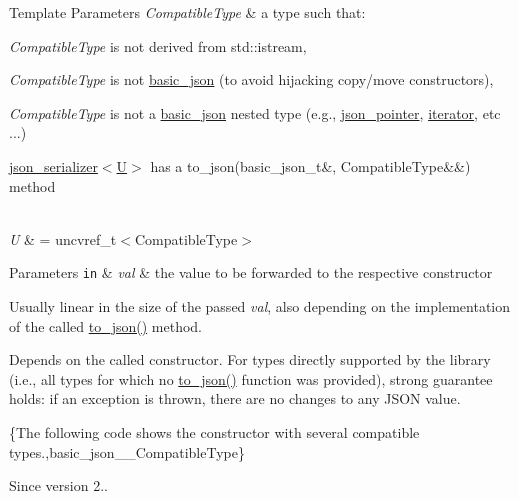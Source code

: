 \begin{DoxyTemplParams}{Template Parameters}
{\em Compatible\+Type} & a type such that\+:
\begin{DoxyItemize}
\item {\itshape Compatible\+Type} is not derived from {\ttfamily std\+::istream},
\item {\itshape Compatible\+Type} is not \hyperlink{classnlohmann_1_1basic__json}{basic\+\_\+json} (to avoid hijacking copy/move constructors),
\item {\itshape Compatible\+Type} is not a \hyperlink{classnlohmann_1_1basic__json}{basic\+\_\+json} nested type (e.\+g., \hyperlink{classnlohmann_1_1json__pointer}{json\+\_\+pointer}, \hyperlink{classnlohmann_1_1basic__json_a099316232c76c034030a38faa6e34dca}{iterator}, etc ...)
\item \hyperlink{classnlohmann_1_1basic__json_a7768841baaaa7a21098a401c932efaff}{json\+\_\+serializer$<$\+U$>$} has a {\ttfamily to\+\_\+json(basic\+\_\+json\+\_\+t\&, Compatible\+Type\&\&)} method
\end{DoxyItemize}\\
\hline
{\em U} & = {\ttfamily uncvref\+\_\+t$<$Compatible\+Type$>$}\\
\hline
\end{DoxyTemplParams}

\begin{DoxyParams}[1]{Parameters}
\mbox{\tt in}  & {\em val} & the value to be forwarded to the respective constructor\\
\hline
\end{DoxyParams}
Usually linear in the size of the passed {\itshape val}, also depending on the implementation of the called {\ttfamily \hyperlink{namespacenlohmann_1_1detail_aa7a47b08eee864c2c108c04954919648}{to\+\_\+json()}} method.

Depends on the called constructor. For types directly supported by the library (i.\+e., all types for which no {\ttfamily \hyperlink{namespacenlohmann_1_1detail_aa7a47b08eee864c2c108c04954919648}{to\+\_\+json()}} function was provided), strong guarantee holds\+: if an exception is thrown, there are no changes to any J\+S\+ON value.

\{The following code shows the constructor with several compatible types.,basic\+\_\+json\+\_\+\+\_\+\+Compatible\+Type\}

\begin{DoxySince}{Since}
version 2.. 
\end{DoxySince}


